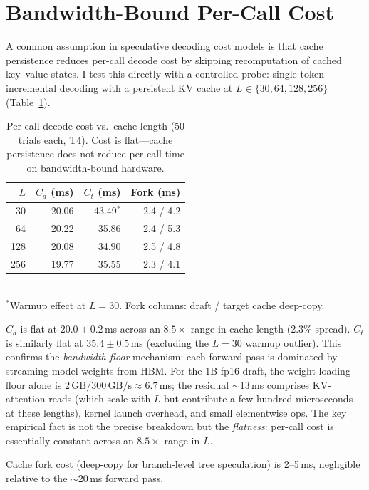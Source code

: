 \documentclass[letterpaper,twocolumn,10pt]{article}
\begin{document}
\section{Bandwidth-Bound Per-Call Cost}
\label{sec:probe}

A common assumption in speculative decoding cost models is that cache persistence reduces per-call decode cost by skipping recomputation of cached key--value states.
I test this directly with a controlled probe: single-token incremental decoding with a persistent KV cache at $L \in \{30, 64, 128, 256\}$ (Table~\ref{tab:probe}).

\begin{table}[t]
\centering
\small
\caption{Per-call decode cost vs.\ cache length (50 trials each, T4). Cost is flat---cache persistence does not reduce per-call time on bandwidth-bound hardware.}
\label{tab:probe}
\smallskip
\begin{tabular}{@{}rrrr@{}}
\toprule
$L$ & $C_d$ (ms) & $C_t$ (ms) & Fork (ms) \\
\midrule
30  & 20.06 & 43.49$^*$ & 2.4 / 4.2 \\
64  & 20.22 & 35.86 & 2.4 / 5.3 \\
128 & 20.08 & 34.90 & 2.5 / 4.8 \\
256 & 19.77 & 35.55 & 2.3 / 4.1 \\
\bottomrule
\end{tabular}
\\[2pt]
{\scriptsize $^*$Warmup effect at $L{=}30$. Fork columns: draft / target cache deep-copy.}
\end{table}

$C_d$ is flat at $20.0 \pm 0.2$\,ms across an $8.5\times$ range in cache length (2.3\% spread).
$C_t$ is similarly flat at $35.4 \pm 0.5$\,ms (excluding the $L{=}30$ warmup outlier).
This confirms the \emph{bandwidth-floor} mechanism: each forward pass is dominated by streaming model weights from HBM.
For the 1B fp16 draft, the weight-loading floor alone is $2\,\text{GB} / 300\,\text{GB/s} \approx 6.7$\,ms; the residual $\sim$13\,ms comprises KV-attention reads (which scale with $L$ but contribute a few hundred microseconds at these lengths), kernel launch overhead, and small elementwise ops.
The key empirical fact is not the precise breakdown but the \emph{flatness}: per-call cost is essentially constant across an $8.5\times$ range in $L$.

Cache fork cost (deep-copy for branch-level tree speculation) is 2--5\,ms, negligible relative to the $\sim$20\,ms forward pass.
\end{document}

